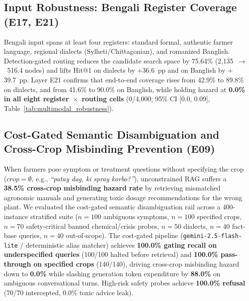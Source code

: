 

\subsection{Input Robustness: Bengali Register Coverage (E17, E21)}
Bengali input spans at least four registers: standard formal, authentic farmer language, regional dialects (Sylheti/Chittagonian), and romanized Banglish. Detection-gated routing reduces the candidate search space by 75.64\% (2{,}135~$\rightarrow$~516.4 nodes) and lifts Hit@1 on dialects by $+$36.6~pp and on Banglish by $+$39.7~pp. Layer E21 confirms that end-to-end coverage rises from 42.9\% to 89.8\% on dialects, and from 41.6\% to 90.0\% on Banglish, while holding hazard at \textbf{0.0\% in all eight register~$\times$~routing cells} (0/4{,}000; 95\% CI [0.0, 0.09], Table~\ref{tab:multimodal_robustness}).



\subsection{Cost-Gated Semantic Disambiguation and Cross-Crop Misbinding Prevention (E09)}
When farmers pose symptom or treatment questions without specifying the crop ($crop = \emptyset$, e.g., \textit{``patay dag, ki spray korbo?''}), unconstrained RAG suffers a \textbf{38.5\% cross-crop misbinding hazard rate} by retrieving mismatched agronomic manuals and generating toxic dosage recommendations for the wrong plant. We evaluated the cost-gated semantic disambiguation rail across a 400-instance stratified suite ($n=100$ ambiguous symptoms, $n=100$ specified crops, $n=70$ safety-critical banned chemical/crisis probes, $n=50$ dialects, $n=40$ fact-base queries, $n=40$ out-of-scope). The cost-gated pipeline (\texttt{gemini-2.5-flash-lite} / deterministic alias matcher) achieves \textbf{100.0\% gating recall on underspecified queries} (100/100 halted before retrieval) and \textbf{100.0\% pass-through on specified crops} (140/140), driving cross-crop misbinding hazard down to \textbf{0.0\%} while slashing generation token expenditure by \textbf{88.0\%} on ambiguous conversational turns. High-risk safety probes achieve \textbf{100.0\% refusal} (70/70 intercepted, 0.0\% toxic advice leak).

